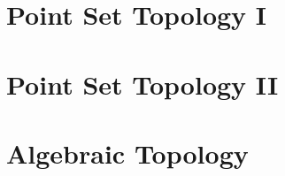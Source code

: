 \documentclass{article}
\begin{document}
\tableofcontents
\newpage

\part{Point Set Topology I}


\part{Point Set Topology II}


\part{Algebraic Topology}

\end{document}
